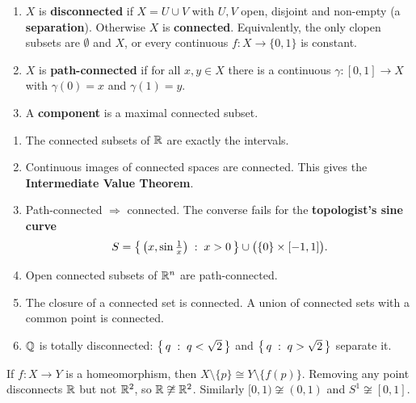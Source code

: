 \begin{definition}
\leavevmode
\begin{enumerate}[label=(\roman*)]
  \item $X$ is \textbf{disconnected} if $X=U\cup V$ with $U,V$ open, disjoint and non-empty (a \textbf{separation}). Otherwise $X$ is \textbf{connected}. Equivalently, the only clopen subsets are $\emptyset$ and $X$, or every continuous $f\colon X\to\{0,1\}$ is constant.
  \item $X$ is \textbf{path-connected} if for all $x,y\in X$ there is a continuous $\gamma\colon[0,1]\to X$ with $\gamma(0)=x$ and $\gamma(1)=y$.
  \item A \textbf{component} is a maximal connected subset.
\end{enumerate}
\end{definition}

\begin{theorem}
\leavevmode
\begin{enumerate}[label=(\roman*)]
  \item The connected subsets of $\mathbb{R}$ are exactly the intervals.
  \item Continuous images of connected spaces are connected. This gives the \textbf{Intermediate Value Theorem}.
  \item Path-connected $\Rightarrow$ connected. The converse fails for the \textbf{topologist's sine curve}
  \[ S=\left\{\, \bigl(x,\sin\tfrac1x\bigr) \;:\; x>0 \,\right\}\cup\bigl(\{0\}\times[-1,1]\bigr). \]
  \item Open connected subsets of $\mathbb{R}^n$ are path-connected.
  \item The closure of a connected set is connected. A union of connected sets with a common point is connected.
  \item $\mathbb{Q}$ is totally disconnected: $\left\{\, q \;:\; q<\sqrt2 \,\right\}$ and $\left\{\, q \;:\; q>\sqrt2 \,\right\}$ separate it.
\end{enumerate}
\end{theorem}

\begin{examtip}
If $f\colon X\to Y$ is a homeomorphism, then $X\setminus\{p\}\cong Y\setminus\{f(p)\}$. Removing any point disconnects $\mathbb{R}$ but not $\mathbb{R}^2$, so $\mathbb{R}\not\cong\mathbb{R}^2$. Similarly $[0,1)\not\cong(0,1)$ and $S^1\not\cong[0,1]$.
\end{examtip}

